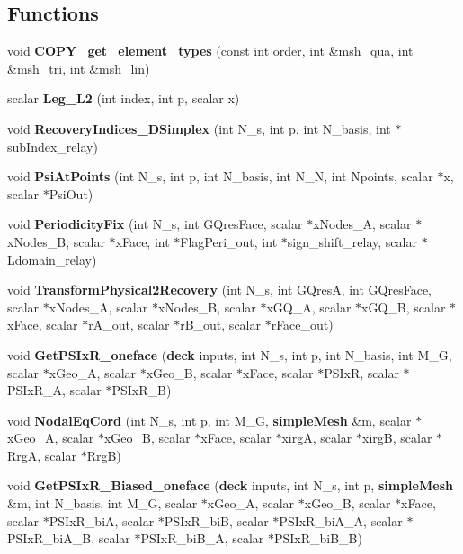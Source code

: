 \subsection*{Functions}
\begin{DoxyCompactItemize}
\item 
void {\bfseries C\-O\-P\-Y\-\_\-get\-\_\-element\-\_\-types} (const int order, int \&msh\-\_\-qua, int \&msh\-\_\-tri, int \&msh\-\_\-lin)\label{recovery__tools_8h_ab380f73205a4cfd9640a45dbe7e98ce2}

\item 
scalar {\bfseries Leg\-\_\-\-L2} (int index, int p, scalar x)\label{recovery__tools_8h_af43a1ba4d244d999db0c3048a2fa2750}

\item 
void {\bf Recovery\-Indices\-\_\-D\-Simplex} (int N\-\_\-s, int p, int N\-\_\-basis, int $\ast$sub\-Index\-\_\-relay)
\item 
void {\bf Psi\-At\-Points} (int N\-\_\-s, int p, int N\-\_\-basis, int N\-\_\-\-N, int Npoints, scalar $\ast$x, scalar $\ast$Psi\-Out)
\item 
void {\bf Periodicity\-Fix} (int N\-\_\-s, int G\-Qres\-Face, scalar $\ast$x\-Nodes\-\_\-\-A, scalar $\ast$x\-Nodes\-\_\-\-B, scalar $\ast$x\-Face, int $\ast$Flag\-Peri\-\_\-out, int $\ast$sign\-\_\-shift\-\_\-relay, scalar $\ast$Ldomain\-\_\-relay)
\item 
void {\bf Transform\-Physical2\-Recovery} (int N\-\_\-s, int G\-Qres\-A, int G\-Qres\-Face, scalar $\ast$x\-Nodes\-\_\-\-A, scalar $\ast$x\-Nodes\-\_\-\-B, scalar $\ast$x\-G\-Q\-\_\-\-A, scalar $\ast$x\-G\-Q\-\_\-\-B, scalar $\ast$x\-Face, scalar $\ast$r\-A\-\_\-out, scalar $\ast$r\-B\-\_\-out, scalar $\ast$r\-Face\-\_\-out)
\item 
void {\bf Get\-P\-S\-Ix\-R\-\_\-oneface} ({\bf deck} inputs, int N\-\_\-s, int p, int N\-\_\-basis, int M\-\_\-\-G, scalar $\ast$x\-Geo\-\_\-\-A, scalar $\ast$x\-Geo\-\_\-\-B, scalar $\ast$x\-Face, scalar $\ast$P\-S\-Ix\-R, scalar $\ast$P\-S\-Ix\-R\-\_\-\-A, scalar $\ast$P\-S\-Ix\-R\-\_\-\-B)
\item 
void {\bf Nodal\-Eq\-Cord} (int N\-\_\-s, int p, int M\-\_\-\-G, {\bf simple\-Mesh} \&m, scalar $\ast$x\-Geo\-\_\-\-A, scalar $\ast$x\-Geo\-\_\-\-B, scalar $\ast$x\-Face, scalar $\ast$xirg\-A, scalar $\ast$xirg\-B, scalar $\ast$Rrg\-A, scalar $\ast$Rrg\-B)
\item 
void {\bf Get\-P\-S\-Ix\-R\-\_\-\-Biased\-\_\-oneface} ({\bf deck} inputs, int N\-\_\-s, int p, {\bf simple\-Mesh} \&m, int N\-\_\-basis, int M\-\_\-\-G, scalar $\ast$x\-Geo\-\_\-\-A, scalar $\ast$x\-Geo\-\_\-\-B, scalar $\ast$x\-Face, scalar $\ast$P\-S\-Ix\-R\-\_\-bi\-A, scalar $\ast$P\-S\-Ix\-R\-\_\-bi\-B, scalar $\ast$P\-S\-Ix\-R\-\_\-bi\-A\-\_\-\-A, scalar $\ast$P\-S\-Ix\-R\-\_\-bi\-A\-\_\-\-B, scalar $\ast$P\-S\-Ix\-R\-\_\-bi\-B\-\_\-\-A, scalar $\ast$P\-S\-Ix\-R\-\_\-bi\-B\-\_\-\-B)
\end{DoxyCompactItemize}


